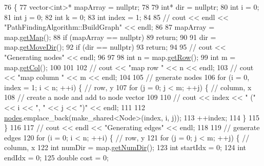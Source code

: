 \begin{DoxyCode}
76                                           \{
77     vector<int>* mapArray = \textcolor{keyword}{nullptr};
78 
79     \textcolor{keywordtype}{int}* dir = \textcolor{keyword}{nullptr};
80     \textcolor{keywordtype}{int} i = 0;
81     \textcolor{keywordtype}{int} j = 0;
82     \textcolor{keywordtype}{int} k = 0;
83     \textcolor{keywordtype}{int} index = 1;
84 
85     \textcolor{comment}{// cout << endl << "PathFindingAlgorithm::BuildGraph" << endl;}
86 
87     mapArray = map.\hyperlink{classMap_ad5c4312f11909eafc091715686b6ceda}{getMap}();
88     \textcolor{keywordflow}{if} (mapArray == \textcolor{keyword}{nullptr})
89         \textcolor{keywordflow}{return};
90 
91     dir = map.\hyperlink{classMap_a4f9142718a50c64152465aacc1033f26}{getMoveDir}();
92     \textcolor{keywordflow}{if} (dir == \textcolor{keyword}{nullptr})
93         \textcolor{keywordflow}{return};
94 
95     \textcolor{comment}{// cout << "Generating nodes" << endl;}
96 
97 
98     \textcolor{keywordtype}{int} n = map.\hyperlink{classMap_a80e0ea134ccb9a22092ce4c520063cd2}{getRow}();
99     \textcolor{keywordtype}{int} m = map.\hyperlink{classMap_a88d24c08a4669040d7de6bd5f6272862}{getCol}();
100 
101 
102     \textcolor{comment}{// cout << "map row " << n << endl;}
103     \textcolor{comment}{// cout << "map column " << m << endl;}
104 
105     \textcolor{comment}{// generate nodes}
106     \textcolor{keywordflow}{for} (i = 0, index = 1; i < n; ++i) \{  \textcolor{comment}{// row, y}
107         \textcolor{keywordflow}{for} (j = 0; j < m; ++j) \{  \textcolor{comment}{// column, x}
108             \textcolor{comment}{// create a node and add to node vector}
109 
110             \textcolor{comment}{// cout << index << " (" << i << ", " << j << ")" << endl;}
111 
112             \hyperlink{classPathFindingAlgorithm_a131201eeaf50772259161b509007e0aa}{nodes}.emplace\_back(make\_shared<Node>(index, i, j));
113             ++index;
114         \}
115     \}
116 
117     \textcolor{comment}{// cout << endl << "Generating edges" << endl;}
118 
119     \textcolor{comment}{// generate edges}
120     \textcolor{keywordflow}{for} (i = 0; i < n; ++i) \{  \textcolor{comment}{// row, y}
121         \textcolor{keywordflow}{for} (j = 0; j < m; ++j) \{  \textcolor{comment}{// column, x}
122             \textcolor{keywordtype}{int} numDir = map.\hyperlink{classMap_a04501949c81ac8dd6a7aeaca908fe969}{getNumDir}();
123             \textcolor{keywordtype}{int} startIdx = 0;
124             \textcolor{keywordtype}{int} endIdx = 0;
125             \textcolor{keywordtype}{double} cost = 0;

\end{DoxyCode}
